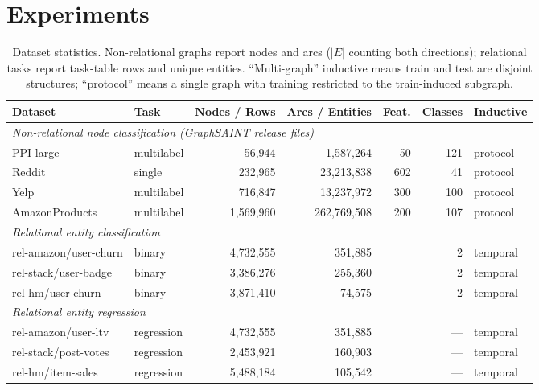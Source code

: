 \documentclass[11pt]{article}
\begin{document}
\section{Experiments}

\begin{table}[H]
\centering\small
\caption{Dataset statistics. Non-relational graphs report nodes and arcs
($|E|$ counting both directions); relational tasks report task-table rows and
unique entities. ``Multi-graph'' inductive means train and test are disjoint
structures; ``protocol'' means a single graph with training restricted to the
train-induced subgraph.}
\label{tab:datasets}
\begin{tabular}{llrrrrl}
\toprule
Dataset & Task & Nodes / Rows & Arcs / Entities & Feat. & Classes & Inductive \\
\midrule
\multicolumn{7}{l}{\textit{Non-relational node classification (GraphSAINT release files)}}\\
PPI-large      & multilabel & 56{,}944      & 1{,}587{,}264   & 50  & 121 & protocol \\
Reddit         & single     & 232{,}965     & 23{,}213{,}838  & 602 & 41  & protocol \\
Yelp           & multilabel & 716{,}847     & 13{,}237{,}972  & 300 & 100 & protocol \\
AmazonProducts & multilabel & 1{,}569{,}960 & 262{,}769{,}508 & 200 & 107 & protocol \\
\midrule
\multicolumn{7}{l}{\textit{Relational entity classification}}\\
rel-amazon/user-churn & binary & 4{,}732{,}555 & 351{,}885 & & 2 & temporal \\
rel-stack/user-badge  & binary & 3{,}386{,}276 & 255{,}360 & & 2 & temporal \\
rel-hm/user-churn     & binary & 3{,}871{,}410 & 74{,}575  & & 2 & temporal \\
\midrule
\multicolumn{7}{l}{\textit{Relational entity regression}}\\
rel-amazon/user-ltv  & regression & 4{,}732{,}555 & 351{,}885 & & --- & temporal \\
rel-stack/post-votes & regression & 2{,}453{,}921 & 160{,}903 & & --- & temporal \\
rel-hm/item-sales    & regression & 5{,}488{,}184 & 105{,}542 & & --- & temporal \\
\midrule

\end{tabular}
\end{table}
\end{document}
